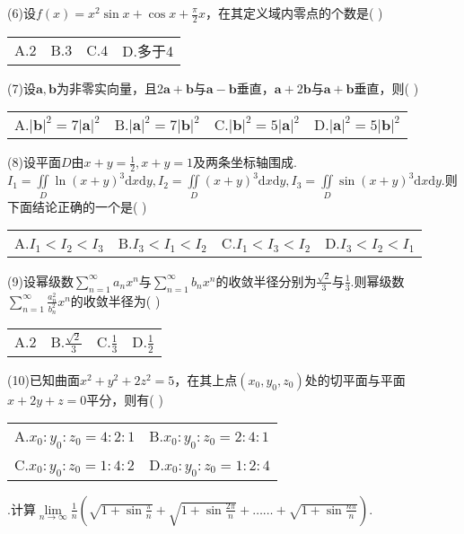 \documentclass[UTF8]{ctexart}
\begin{document}
\noindent(6)设$ f(x)=x^2\sin{x}+\cos{x}+\frac{\pi}{2}x $，在其定义域内零点的个数是(	)\\
\begin{tabular}{llll}
	A.$ 2 $& B.$ 3 $& C.$ 4 $& D.多于4
\end{tabular}

\noindent(7)设$ \boldsymbol{a},\boldsymbol{b} $为非零实向量，且$ 2\boldsymbol{a}+\boldsymbol{b} $与$ \boldsymbol{a}-\boldsymbol{b} $垂直，$ \boldsymbol{a}+2\boldsymbol{b} $与$ \boldsymbol{a}+\boldsymbol{b} $垂直，则(	)\\
\begin{tabular}{llll}
	A.$ \left|\boldsymbol{b}\right|^2=7\left|\boldsymbol{a}\right|^2 $&
	B.$ \left|\boldsymbol{a}\right|^2=7\left|\boldsymbol{b}\right|^2 $&
	C.$ \left|\boldsymbol{b}\right|^2=5\left|\boldsymbol{a}\right|^2 $&
	D.$ \left|\boldsymbol{a}\right|^2=5\left|\boldsymbol{b}\right|^2 $
\end{tabular}

\thispagestyle{empty}

\noindent(8)设平面$ D $由$ x+y= \frac{1}{2},x+y=1 $及两条坐标轴围成.$ I_1=\underset{D}\iint\ln(x+y)^3\mathrm{d}x\mathrm{d}y,I_2=\underset{D}\iint(x+y)^3\mathrm{d}x\mathrm{d}y,I_3=\underset{D}\iint\sin(x+y)^3\mathrm{d}x\mathrm{d}y. $则下面结论正确的一个是(	)\\
\begin{tabular}{llll}
	A.$ I_1<I_2<I_3 $&
	B.$ I_3<I_1<I_2 $&
	C.$ I_1<I_3<I_2 $&
	D.$ I_3<I_2<I_1 $
\end{tabular}

\noindent(9)设幂级数$ \sum\limits_{n=1}^ \infty a_nx^n $与$ \sum\limits_{n=1}^{\infty}b_nx^n $的收敛半径分别为$ \frac{\sqrt{2}}{3} $与$ \frac{1}{3} $.则幂级数$ \sum\limits_{n=1}^{\infty}\frac{a_n^2}{b_n^2}x^n $的收敛半径为(	)\\
\begin{tabular}{llll}
	A.$ 2 $&
	B.$ \frac{\sqrt{2}}{3} $&
	C.$ \frac{1}{3} $&
	D.$ \frac{1}{2} $
\end{tabular}

\noindent(10)已知曲面$ x^2+y^2+2z^2=5 $，在其上点$ (x_0,y_0,z_0) $处的切平面与平面$ x+2y+z=0 $平分，则有(	)\\
\begin{tabular}{ll}
	A.$ x_0:y_0:z_0=4:2:1 $&
	B.$ x_0:y_0:z_0=2:4:1 $\\
	C.$ x_0:y_0:z_0=1:4:2 $&
	D.$ x_0:y_0:z_0=1:2:4 $
\end{tabular}

.计算$\underset{n\rightarrow\infty}{\lim}\frac{1}{n}\left(\sqrt{1+\sin\frac{\pi}{n}}+\sqrt{1+\sin\frac{2\pi}{n}}+\text{……}+\sqrt{1+\sin\frac{n\pi}{n}}\right)$.
\end{document}
